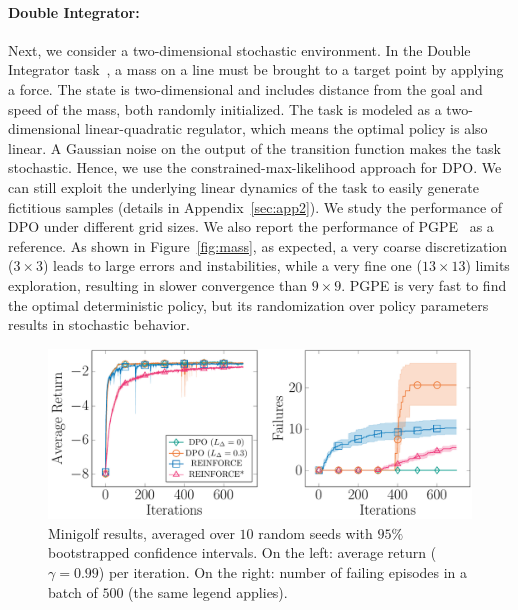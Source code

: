 \paragraph{Double Integrator:} Next, we consider a two-dimensional stochastic environment. In the Double Integrator task~\citep{recht2018tour}, a mass on a line must be brought to a target point by applying a force. The state is two-dimensional and includes distance from the goal and speed of the mass, both randomly initialized. The task is modeled as a two-dimensional linear-quadratic regulator, which means the optimal policy is also linear. A Gaussian noise on the output of the transition function makes the task stochastic. Hence, we use the constrained-max-likelihood approach for DPO. We can still exploit the underlying linear dynamics of the task to easily generate fictitious samples (details in Appendix~\ref{sec:app2}).
We study the performance of DPO under different grid sizes. We also report the performance of PGPE~\citep{sehnke2008policy} as a reference. As shown in Figure~\ref{fig:mass}, as expected, a very coarse discretization ($3\times3$) leads to large errors and instabilities, while a very fine one ($13\times13$) limits exploration, resulting in slower convergence than $9\times9$. PGPE is very fast to find the optimal deterministic policy, but its randomization over policy parameters results in stochastic behavior.
%
\begin{figure}[t]
	\includegraphics[width=\columnwidth]{plots/minigolf.pdf}
	\caption{Minigolf results, averaged over $10$ random seeds with $95\%$ bootstrapped confidence intervals. On the left: average return ($\gamma=0.99$) per iteration. On the right: number of failing episodes in a batch of $500$ (the same legend applies).}
	\label{fig:minigolf}
\end{figure}
%
